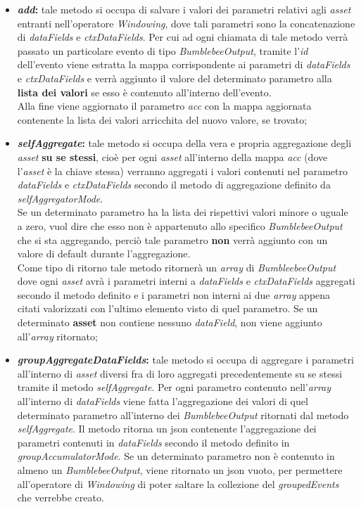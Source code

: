 \begin{itemize}
	\item{\textbf{\textit{add}:} tale metodo si occupa di salvare i valori dei parametri relativi agli \textit{asset} entranti nell'operatore \textit{Windowing}, dove tali parametri sono la concatenazione di \textit{dataFields} e \textit{ctxDataFields}. Per cui ad ogni chiamata di tale metodo verrà passato un particolare evento di tipo \textit{BumblebeeOutput}, tramite l'\textit{id} dell'evento viene estratta la mappa corrispondente ai parametri di \textit{dataFields} e \textit{ctxDataFields} e verrà aggiunto il valore del determinato parametro alla \textbf{lista dei valori} se esso è contenuto all'interno dell'evento.\\
Alla fine viene aggiornato il parametro \textit{acc} con la mappa aggiornata contenente la lista dei valori arricchita del nuovo valore, se trovato;}
	\item{\textbf{\textit{selfAggregate}:} tale metodo si occupa della vera e propria aggregazione degli \textit{asset} \textbf{su se stessi}, cioè per ogni \textit{asset} all'interno della mappa \textit{acc} (dove l'\textit{asset} è la chiave stessa) verranno aggregati i valori contenuti nel parametro \textit{dataFields} e \textit{ctxDataFields} secondo il metodo di aggregazione definito da \textit{selfAggregatorMode}.\\
	Se un determinato parametro ha la lista dei rispettivi valori minore o uguale a zero, vuol dire che esso non è appartenuto allo specifico \textit{BumblebeeOutput} che si sta aggregando, perciò tale parametro \textbf{non} verrà aggiunto con un valore di default durante l'aggregazione.\\
	Come tipo di ritorno tale metodo ritornerà un \textit{array} di \textit{BumbleebeeOutput} dove ogni \textit{asset} avrà i parametri interni a \textit{dataFields} e \textit{ctxDataFields} aggregati secondo il metodo definito e i parametri non interni ai due \textit{array} appena citati valorizzati con l'ultimo elemento visto di quel parametro. Se un determinato \textbf{asset} non contiene nessuno \textit{dataField}, non viene aggiunto all'\textit{array} ritornato;}
	\item{\textbf{\textit{groupAggregateDataFields}:} tale metodo si occupa di aggregare i parametri all'interno di \textit{asset} diversi fra di loro aggregati precedentemente su se stessi tramite il metodo \textit{selfAggregate}. Per ogni parametro contenuto nell'\textit{array} all'interno di \textit{dataFields} viene fatta l'aggregazione dei valori di quel determinato parametro all'interno dei \textit{BumblebeeOutput} ritornati dal metodo \textit{selfAggregate}. Il metodo ritorna un \gls{json} contenente l'aggregazione dei parametri contenuti in \textit{dataFields} secondo il metodo definito in \textit{groupAccumulatorMode}. Se un determinato parametro non è contenuto in almeno un \textit{BumblebeeOutput}, viene ritornato un \gls{json} vuoto, per permettere all'operatore di \textit{Windowing} di poter saltare la collezione del \textit{groupedEvents} che verrebbe creato.}
\end{itemize}



